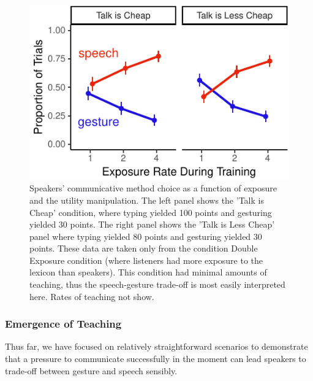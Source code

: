 \documentclass[10pt, letterpaper]{article}
\newenvironment{CodeChunk}{}{}
\begin{document}
\begin{CodeChunk}
\begin{figure}[H]

{\centering \includegraphics{figs/exp_speech_gesture-1} 

}

\caption[Speakers' communicative method choice as a function of exposure and the utility manipulation]{Speakers' communicative method choice as a function of exposure and the utility manipulation. The left panel shows the 'Talk is Cheap' condition, where typing yielded 100 points and gesturing yielded 30 points. The right panel shows the 'Talk is Less Cheap' panel where typing yielded 80 points and gesturing yielded 30 points. These data are taken only from the condition Double Exposure condition (where listeners had more exposure to the lexicon than speakers). This condition had minimal amounts of teaching, thus the speech-gesture trade-off is most easily interpreted here. Rates of teaching not show.}\label{fig:exp_speech_gesture}
\end{figure}
\end{CodeChunk}

\subsubsection{Emergence of Teaching}\label{emergence-of-teaching}

Thus far, we have focused on relatively straightforward scenarios to
demonstrate that a pressure to communicate successfully in the moment
can lead speakers to trade-off between gesture and speech sensibly.
\end{document}

